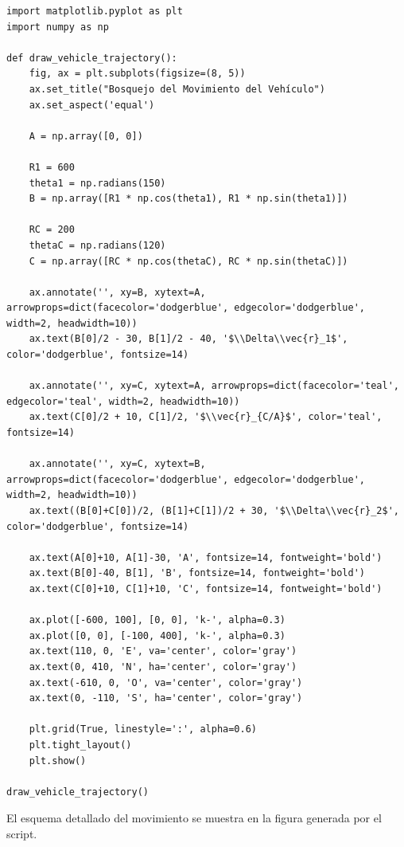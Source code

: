 \documentclass[12pt, a4paper]{article}
\begin{document}
\begin{lstlisting}
import matplotlib.pyplot as plt
import numpy as np

def draw_vehicle_trajectory():
    fig, ax = plt.subplots(figsize=(8, 5))
    ax.set_title("Bosquejo del Movimiento del Vehículo")
    ax.set_aspect('equal')
    
    A = np.array([0, 0])
    
    R1 = 600
    theta1 = np.radians(150)
    B = np.array([R1 * np.cos(theta1), R1 * np.sin(theta1)])
    
    RC = 200
    thetaC = np.radians(120)
    C = np.array([RC * np.cos(thetaC), RC * np.sin(thetaC)])
    
    ax.annotate('', xy=B, xytext=A, arrowprops=dict(facecolor='dodgerblue', edgecolor='dodgerblue', width=2, headwidth=10))
    ax.text(B[0]/2 - 30, B[1]/2 - 40, '$\\Delta\\vec{r}_1$', color='dodgerblue', fontsize=14)
    
    ax.annotate('', xy=C, xytext=A, arrowprops=dict(facecolor='teal', edgecolor='teal', width=2, headwidth=10))
    ax.text(C[0]/2 + 10, C[1]/2, '$\\vec{r}_{C/A}$', color='teal', fontsize=14)
    
    ax.annotate('', xy=C, xytext=B, arrowprops=dict(facecolor='dodgerblue', edgecolor='dodgerblue', width=2, headwidth=10))
    ax.text((B[0]+C[0])/2, (B[1]+C[1])/2 + 30, '$\\Delta\\vec{r}_2$', color='dodgerblue', fontsize=14)
    
    ax.text(A[0]+10, A[1]-30, 'A', fontsize=14, fontweight='bold')
    ax.text(B[0]-40, B[1], 'B', fontsize=14, fontweight='bold')
    ax.text(C[0]+10, C[1]+10, 'C', fontsize=14, fontweight='bold')
    
    ax.plot([-600, 100], [0, 0], 'k-', alpha=0.3)
    ax.plot([0, 0], [-100, 400], 'k-', alpha=0.3)
    ax.text(110, 0, 'E', va='center', color='gray')
    ax.text(0, 410, 'N', ha='center', color='gray')
    ax.text(-610, 0, 'O', va='center', color='gray')
    ax.text(0, -110, 'S', ha='center', color='gray')

    plt.grid(True, linestyle=':', alpha=0.6)
    plt.tight_layout()
    plt.show()

draw_vehicle_trajectory()
\end{lstlisting}

\begin{tcolorbox}[colback=green!5!white, colframe=green!50!black, title=Respuesta Final]
\centering El esquema detallado del movimiento se muestra en la figura generada por el script.
\end{tcolorbox}
\end{document}
